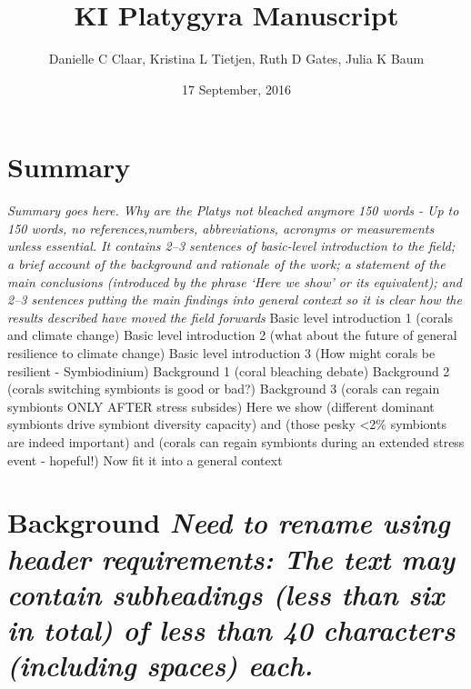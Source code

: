 \documentclass[]{article}
\title{KI Platygyra Manuscript}
\author{Danielle C Claar, Kristina L Tietjen, Ruth D Gates, Julia K Baum}
\date{17 September, 2016}
\begin{document}
\maketitle

\section{Summary}\label{summary}

\emph{Summary goes here. Why are the Platys not bleached anymore}
\emph{150 words - Up to 150 words, no references,numbers, abbreviations,
acronyms or measurements unless essential. It contains 2--3 sentences of
basic-level introduction to the field; a brief account of the background
and rationale of the work; a statement of the main conclusions
(introduced by the phrase `Here we show' or its equivalent); and 2--3
sentences putting the main findings into general context so it is clear
how the results described have moved the field forwards} Basic level
introduction 1 (corals and climate change) Basic level introduction 2
(what about the future of general resilience to climate change) Basic
level introduction 3 (How might corals be resilient - Symbiodinium)
Background 1 (coral bleaching debate) Background 2 (corals switching
symbionts is good or bad?) Background 3 (corals can regain symbionts
ONLY AFTER stress subsides) Here we show (different dominant symbionts
drive symbiont diversity capacity) and (those pesky \textless{}2\%
symbionts are indeed important) and (corals can regain symbionts during
an extended stress event - hopeful!) Now fit it into a general context

\section{\texorpdfstring{Background \emph{Need to rename using header
requirements: The text may contain subheadings (less than six in total)
of less than 40 characters (including spaces)
each.}}{Background Need to rename using header requirements: The text may contain subheadings (less than six in total) of less than 40 characters (including spaces) each.}}\label{background-need-to-rename-using-header-requirements-the-text-may-contain-subheadings-less-than-six-in-total-of-less-than-40-characters-including-spaces-each.}
\end{document}
